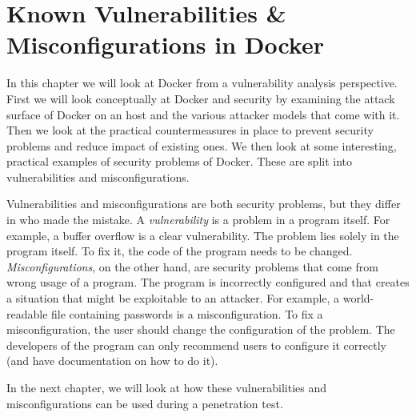 \chapter{Known Vulnerabilities \& Misconfigurations in Docker}
In this chapter we will look at Docker from a vulnerability analysis perspective. First we will look conceptually at Docker and security by examining the attack surface of Docker on an host and the various attacker models that come with it. Then we look at the practical countermeasures in place to prevent security problems and reduce impact of existing ones. We then look at some interesting, practical examples of security problems of Docker. These are split into vulnerabilities and misconfigurations.

\hfill

Vulnerabilities and misconfigurations are both security problems, but they differ in who made the mistake. A \emph{vulnerability} is a problem in a program itself. For example, a buffer overflow is a clear vulnerability. The problem lies solely in the program itself. To fix it, the code of the program needs to be changed. \emph{Misconfigurations}, on the other hand, are security problems that come from wrong usage of a program. The program is incorrectly configured and that creates a situation that might be exploitable to an attacker. For example, a world-readable file containing passwords is a misconfiguration. To fix a misconfiguration, the user should change the configuration of the problem. The developers of the program can only recommend users to configure it correctly (and have documentation on how to do it).

\hfill

In the next chapter, we will look at how these vulnerabilities and misconfigurations can be used during a penetration test.





